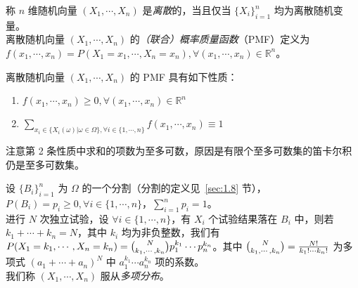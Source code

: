 \documentclass[../main.tex]{subfiles}
\begin{document}
\begin{definition}\label{def:3.2.1}
称 $n$ 维随机向量 $(X_1,\cdots,X_n)$ 是\emph{离散}的，当且仅当 $\{X_i\}_{i=1}^n$ 均为离散随机变量。\\
离散随机向量 $(X_1,\cdots,X_n)$ 的\emph{（联合）概率质量函数}（PMF）定义为 $f(x_1,\cdots,x_n)=P(X_1=x_1,\cdots,X_n=x_n),\forall(x_1,\cdots,x_n)\in \mathbb R^n$。
\end{definition}

\begin{proposition}
离散随机向量 $(X_1,\cdots,X_n)$ 的 PMF 具有如下性质：
\begin{enumerate}
    \item $f(x_1,\cdots,x_n)\geq0,\forall(x_1,\cdots,x_n)\in \mathbb R^n$
    \item $\sum_{x_i\in\{X_i(\omega)|\omega\in\Omega\},\forall i\in\{1,\cdots,n\}}f(x_1,\cdots,x_n)\equiv1$
\end{enumerate}
\end{proposition}

注意第 2 条性质中求和的项数为至多可数，原因是有限个至多可数集的笛卡尔积仍是至多可数集。

\begin{example}
设 $\{B_i\}_{i=1}^n$ 为 $\Omega$ 的一个分割（分割的定义见~\ref{sec:1.8} 节），$P(B_i)=p_i\geq0,\forall i\in\{1,\cdots,n\}$，$\sum_{i=1}^n p_i=1$。\\
进行 $N$ 次独立试验，设 $\forall i\in\{1,\cdots,n\}$，有 $X_i$ 个试验结果落在 $B_i$ 中，则若 $k_1+\cdots+k_n=N$，其中 $k_i$ 均为非负整数，我们有 $P(X_1=k_1,\cdots,X_n=k_n)=\tbinom{N}{k_1,\cdots,k_n}p_1^{k_1}\cdots p_n^{k_n}$。其中 $\tbinom{N}{k_1,\cdots,k_n}=\frac{N!}{k_1!\cdots k_n!}$ 为多项式 $(a_1+\cdots+a_n)^N$ 中 $a_1^{k_1}\cdots a_n^{k_n}$ 项的系数。\\
我们称 $(X_1,\cdots,X_n)$ 服从\emph{多项分布}。
\end{example}
\end{document}

